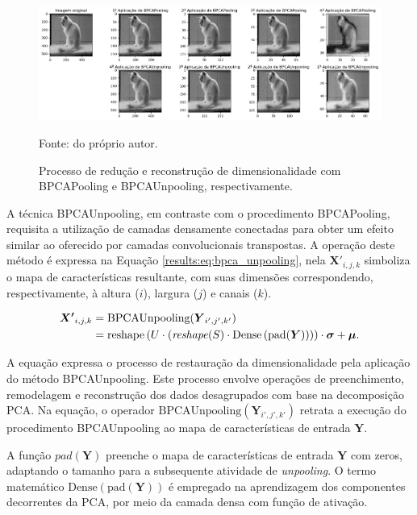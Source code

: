 \begin{figure}[H]
    \centering
    \caption[Aplicação de BPCAPooling e BPCAUnpooling.]{Processo de redução e reconstrução de dimensionalidade com BPCAPooling e BPCAUnpooling, respectivamente.}
    \label{results:fig:future:0}
    \includegraphics[width=1\textwidth]{recursos/imagens/results/bpca_unpooling.png}

    Fonte: do próprio autor.
\end{figure}

A técnica BPCAUnpooling, em contraste com o procedimento BPCAPooling, requisita a utilização de camadas densamente conectadas para obter um efeito similar ao oferecido por camadas convolucionais transpostas. A operação deste método é expressa na Equação \ref{results:eq:bpca_unpooling}, nela $\boldsymbol{X'}_{i,j,k}$ simboliza o mapa de características resultante, com suas dimensões correspondendo, respectivamente, à altura ($i$), largura ($j$) e canais ($k$).

\begin{equation}
    \label{results:eq:bpca_unpooling}
    \begin{split}
        \boldsymbol{X'}_{i,j,k} &= \text{BPCAUnpooling}(\boldsymbol{Y}_{i',j',k'}) \\
                  &= \text{reshape}\left(U \cdot \left(\text{\textit{reshape}}(S) \cdot \text{Dense}\left(\text{pad}(\boldsymbol{Y})\right)\right)\right) \cdot {\boldsymbol{\sigma}} + {\boldsymbol{\mu}}.
    \end{split}
\end{equation}

A equação expressa o processo de restauração da dimensionalidade pela aplicação do método BPCAUnpooling. Este processo envolve operações de preenchimento, remodelagem e reconstrução dos dados desagrupados com base na decomposição PCA. Na equação, o operador $\text{BPCAUnpooling}(\boldsymbol{Y}_{i',j',k'})$ retrata a execução do procedimento BPCAUnpooling ao mapa de características de entrada $\boldsymbol{Y}$.

A função $pad(\boldsymbol{Y})$ preenche o mapa de características de entrada $\boldsymbol{Y}$ com zeros, adaptando o tamanho para a subsequente atividade de \textit{unpooling}. O termo matemático $\text{Dense}(\text{pad}(\boldsymbol{Y}))$ é empregado na aprendizagem dos componentes decorrentes da PCA, por meio da camada densa com função de ativação.

